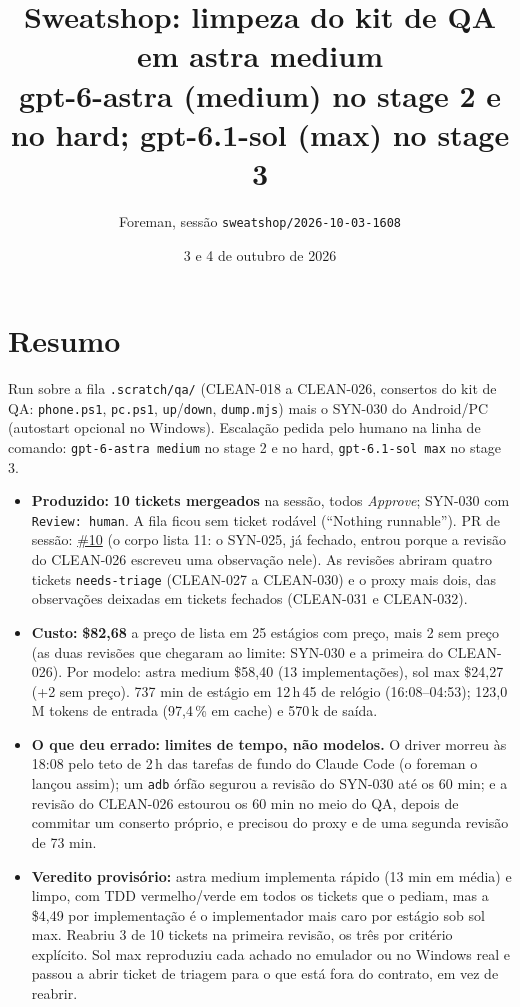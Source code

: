 \documentclass[11pt,a4paper]{article}
\title{Sweatshop: limpeza do kit de QA em astra medium\\\large gpt-6-astra (medium) no stage 2 e no hard; gpt-6.1-sol (max) no stage 3}
\author{Foreman, sessão \texttt{sweatshop/2026-10-03-1608}}
\date{3 e 4 de outubro de 2026}
\begin{document}
\maketitle

\section*{Resumo}

Run sobre a fila \texttt{.scratch/qa/} (CLEAN-018 a CLEAN-026, consertos do
kit de QA: \texttt{phone.ps1}, \texttt{pc.ps1}, \texttt{up}/\texttt{down},
\texttt{dump.mjs}) mais o SYN-030 do Android/PC (autostart opcional no
Windows). Escalação pedida pelo humano na linha de comando: \texttt{gpt-6-astra
medium} no stage 2 e no hard, \texttt{gpt-6.1-sol max} no stage 3.

\begin{itemize}
  \item \textbf{Produzido:} \textbf{10 tickets mergeados} na sessão, todos
        \emph{Approve}; SYN-030 com \texttt{Review: human}. A fila ficou sem
        ticket rodável (``Nothing runnable''). PR de sessão:
        \href{https://github.com/Laginho/SynchroNice/pull/10}{\#10} (o corpo
        lista 11: o SYN-025, já fechado, entrou porque a revisão do CLEAN-026
        escreveu uma observação nele). As revisões abriram quatro tickets
        \texttt{needs-triage} (CLEAN-027 a CLEAN-030) e o proxy mais dois, das
        observações deixadas em tickets fechados (CLEAN-031 e CLEAN-032).
  \item \textbf{Custo:} \textbf{\$82,68} a preço de lista em 25 estágios com
        preço, mais 2 sem preço (as duas revisões que chegaram ao limite:
        SYN-030 e a primeira do CLEAN-026). Por modelo: astra medium \$58,40
        (13 implementações), sol max \$24,27 (+2 sem preço). 737 min de estágio
        em 12\,h\,45 de relógio (16:08--04:53); 123,0\,M tokens de entrada
        (97,4\,\% em cache) e 570\,k de saída.
  \item \textbf{O que deu errado:} \textbf{limites de tempo, não modelos.} O
        driver morreu às 18:08 pelo teto de 2\,h das tarefas de fundo do Claude
        Code (o foreman o lançou assim); um \texttt{adb} órfão segurou a revisão
        do SYN-030 até os 60 min; e a revisão do CLEAN-026 estourou os 60 min
        no meio do QA, depois de commitar um conserto próprio, e precisou do
        proxy e de uma segunda revisão de 73 min.
  \item \textbf{Veredito provisório:} astra medium implementa rápido (13 min
        em média) e limpo, com TDD vermelho/verde em todos os tickets que o
        pediam, mas a \$4,49 por implementação é o implementador mais caro por
        estágio sob sol max. Reabriu 3 de 10 tickets na primeira revisão, os
        três por critério explícito. Sol max reproduziu cada achado no
        emulador ou no Windows real e passou a abrir ticket de triagem para o
        que está fora do contrato, em vez de reabrir.
\end{itemize}
\end{document}
